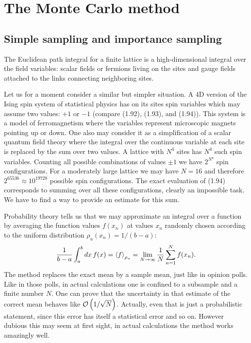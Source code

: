 \section{The Monte Carlo method}

\subsection{Simple sampling and importance sampling}

The Euclidean path integral for a finite lattice is a high-dimensional integral
over the field variables: scalar fields or fermions living on the sites and gauge
fields attached to the links connecting neighboring sites.

Let us for a moment consider a similar but simpler situation. A 4D version
of the Ising spin system of statistical physics has on its sites spin variables
which may assume two values: $+1$ or $-1$ (compare (1.92), (1.93), and (1.94)).
This system is a model of ferromagnetism where the variables represent microscopic magnets pointing up or down. One also may consider it as a simplification of a scalar quantum field theory where the integral over the continuous
variable at each site is replaced by the sum over two values. A lattice with $N^4$
sites has $N^4$ such spin variables. Counting all possible combinations of values
$\pm 1$ we have $2^{N^4}$ spin configurations. For a moderately large lattice we
may have $N = 16$ and therefore $2^{65536} \approx 10^{19728}$ possible spin configurations. The exact evaluation of (1.94) corresponds to summing over all these
configurations, clearly an impossible task. We have to find a way to provide an estimate
for this sum.

Probability theory tells us that we may approximate an integral over a
function by averaging the function values $f(x_n)$ at values $x_n$ randomly chosen
according to the uniform distribution $\rho_u(x_n) = 1/(b-a)$:
\begin{equation}
  \frac{1}{b-a}\int_a^b dx\,f(x) = \left\langle f \right\rangle_{\rho_u} = \lim_{N\to\infty}\frac{1}{N}\sum_{n=1}^{N} f(x_n).
\end{equation}
The method replaces the exact mean by a sample mean, just like in opinion
polls. Like in those polls, in actual calculations one is confined to a subsample
and a finite number $N$. One can prove that the uncertainty in that estimate
of the correct mean behaves like $\mathcal{O}\left(1/\sqrt{N}\right)$. Actually, even that is just a
probabilistic statement, since this error has itself a statistical error and so
on. However dubious this may seem at first sight, in actual calculations the
method works amazingly well.

